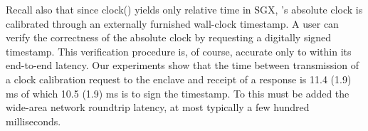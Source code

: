Recall also that since clock() yields only relative time in SGX, \tc's absolute clock is calibrated through an externally furnished wall-clock timestamp.
A user can verify the correctness of the \encname absolute clock by requesting a digitally signed timestamp.
This verification procedure is, of course, accurate only to within its end-to-end latency. Our experiments show that the time between \medname transmission of a clock calibration request to the enclave and receipt of a response is
11.4 (1.9) ms of which 10.5 (1.9) ms is to 
sign the timestamp.
To this must be added the wide-area network roundtrip latency, at most typically a few hundred milliseconds. %
